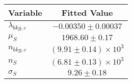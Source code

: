 \begin{tabular}[t]{lc}
\hline
Variable &Fitted Value\\
\hline\hline
$\lambda_{bkg,c}$&$-0.00350\pm0.00037$\\
\hline
$\mu_{S}$&$1968.60\pm0.17$\\
\hline
$n_{bkg,c}$&$(9.91\pm0.14)\times 10^3$\\
\hline
$n_{S}$&$(6.81\pm0.13)\times 10^3$\\
\hline
$\sigma_{S}$&$9.26\pm0.18$\\
\hline
\end{tabular}